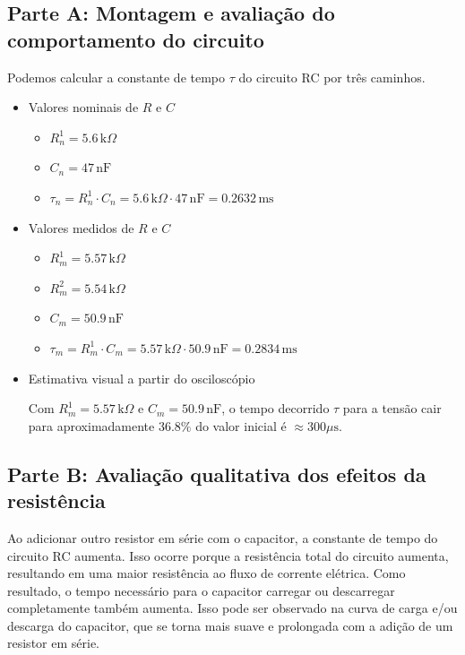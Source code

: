 \documentclass[12pt, a4paper]{article}
\begin{document}
\subsection*{Parte A: Montagem e avaliação do comportamento do circuito}
    Podemos calcular a constante de tempo \(\tau\) do circuito RC por três caminhos.
    \begin{itemize}
        \item [(i)] Valores nominais de \(R\) e \(C\)
            \begin{itemize}
                \item [(a)] \(R_n^1 = 5.6 \, \text{k}\Omega\)
                \item [(b)] \(C_n = 47 \, \text{nF}\)
                \item [(c)] \(\tau_n = R_n^1 \cdot C_n = 5.6 \, \text{k}\Omega \cdot 47 \, \text{nF} = 0.2632 \, \text{ms}\)
            \end{itemize}
        \item [(ii)] Valores medidos de \(R\) e \(C\)
            \begin{itemize}
                \item [(a)] \(R_m^1 = 5.57 \, \text{k}\Omega\)
                \item [(b)] \(R_m^2 = 5.54 \, \text{k}\Omega\)
                \item [(c)] \(C_m = 50.9 \, \text{nF}\)
                \item [(d)] \(\tau_m = R_m^1 \cdot C_m = 5.57 \, \text{k}\Omega \cdot 50.9 \, \text{nF} = 0.2834 \, \text{ms}\)
            \end{itemize}
        \item [(iii)] Estimativa visual a partir do osciloscópio
                
            Com \(R_m^1 = 5.57 \, \text{k}\Omega\) e \(C_m = 50.9 \, \text{nF}\), o tempo decorrido \(\tau\) para a tensão cair para aproximadamente \(36.8\% \) do valor inicial é \(\approx 300\mu\text{s}\).
    \end{itemize}

\subsection*{Parte B: Avaliação qualitativa dos efeitos da resistência}
    Ao adicionar outro resistor em série com o capacitor, a constante de tempo do circuito RC aumenta. Isso ocorre porque a resistência total do circuito aumenta, resultando em uma maior resistência ao fluxo de corrente elétrica. Como resultado, o tempo necessário para o capacitor carregar ou descarregar completamente também aumenta.
    Isso pode ser observado na curva de carga e/ou descarga do capacitor, que se torna mais suave e prolongada com a adição de um resistor em série.
\end{document}

